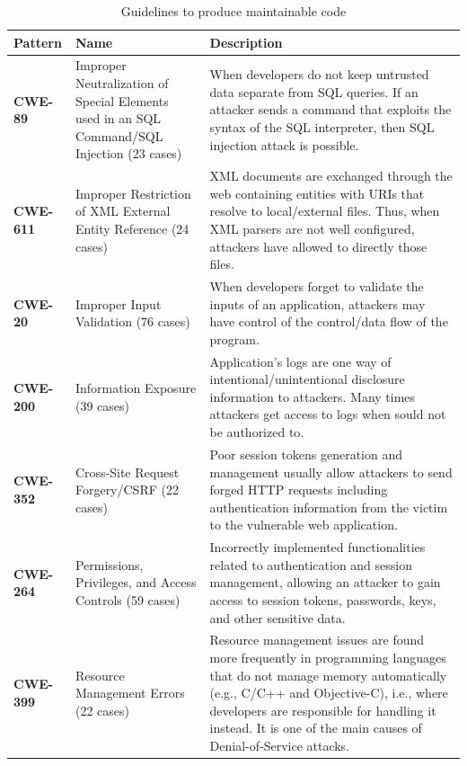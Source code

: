 \documentclass[10pt,conference]{IEEEtran}
\begin{document}
\begin{table}[h]
\footnotesize
	\caption{Guidelines to produce maintainable code}
\begin{tabular}{L{1.1cm}L{2.1cm}L{4.3cm}}

\toprule
\textbf{Pattern} & \textbf{Name} & \textbf{Description}\\
\midrule

\textbf{CWE-89} & 
 Improper Neutralization of Special Elements used in an SQL Command/SQL Injection (23 cases) & 
 When developers do not keep untrusted data
     separate from SQL queries. If an attacker sends a command that
     exploits the syntax of the SQL interpreter, then SQL injection attack is possible.\\\midrule

\textbf{CWE-611} & 
 Improper Restriction of XML External Entity Reference (24 cases) & 
	XML documents are exchanged through the web containing entities with URIs
 	that resolve to local/external files. Thus, when XML parsers are not well configured,
 	attackers have allowed to directly those files.\\\midrule
 
 \textbf{CWE-20} & 
 Improper Input Validation (76 cases) & 
	When developers
 	forget to validate the inputs of an application, attackers may have control
 	of the control/data flow of the program.\\\midrule
 
  \textbf{CWE-200} & 
Information Exposure (39 cases)& 
Application's logs are one way of intentional/unintentional disclosure information
 	to attackers. Many times attackers get access to logs when sould not be authorized to.\\\midrule
 
   \textbf{CWE-352} & 
Cross-Site Request Forgery/CSRF (22 cases)& 
Poor session tokens generation
     and management usually allow attackers to send forged HTTP requests
     including authentication information from the victim to the vulnerable web
     application.\\\midrule
     
       \textbf{CWE-264} & 
Permissions, Privileges, and Access Controls (59 cases)& 
Incorrectly
 	    implemented functionalities related to authentication and session
 	    management, allowing an attacker to gain access to session tokens,
 	    passwords, keys, and other sensitive data.\\\midrule
 	    
 	           \textbf{CWE-399} & 
Resource Management Errors (22 cases)& 
Resource management issues are found more frequently
 		in programming languages that do not manage memory automatically (e.g., C/C++
 	    and Objective-C), i.e., where developers are responsible for
 	    handling it instead. It is one of the main causes of Denial-of-Service attacks.\\\midrule
 	    

\end{tabular}
\end{table}
\end{document}
